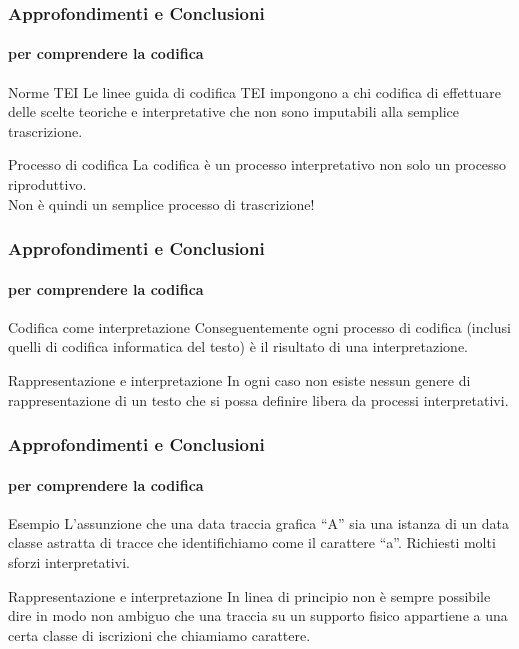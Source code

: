 \begin{frame}
	\frametitle{Approfondimenti e Conclusioni}
	\framesubtitle{per comprendere la codifica}
	\addtocounter{nframe}{1}

	\begin{block}{Norme TEI}
		Le linee guida di codifica TEI impongono a chi codifica di effettuare delle scelte teoriche e interpretative che non sono imputabili alla semplice trascrizione.
    \end{block}
    
    \begin{block}{Processo di codifica}
        La codifica è un processo interpretativo non solo un processo riproduttivo.
        \\Non è quindi un semplice processo di trascrizione!
    \end{block}
    

\end{frame}


\begin{frame}
	\frametitle{Approfondimenti e Conclusioni}
	\framesubtitle{per comprendere la codifica}
	\addtocounter{nframe}{1}

	\begin{block}{Codifica come interpretazione}
		Conseguentemente ogni processo di codifica (inclusi quelli di codifica informatica del testo) è il risultato di una interpretazione.
    \end{block}
    
    \begin{block}{Rappresentazione e interpretazione}
        In ogni caso non esiste nessun genere di rappresentazione di un testo che si possa definire libera da processi interpretativi.
    \end{block}

\end{frame}

\begin{frame}
	\frametitle{Approfondimenti e Conclusioni}
	\framesubtitle{per comprendere la codifica}
	\addtocounter{nframe}{1}

	\begin{block}{Esempio}
		L’assunzione che una data traccia grafica ``A'' sia una istanza di un data classe astratta di tracce che identifichiamo come il carattere ``a''. Richiesti molti sforzi interpretativi.
    \end{block}
    
    \begin{block}{Rappresentazione e interpretazione}
        In linea di principio non è sempre possibile dire in modo non ambiguo che una traccia su un supporto fisico appartiene a una certa classe di iscrizioni che chiamiamo carattere.
    \end{block}

\end{frame}


